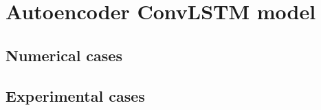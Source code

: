 \section{Autoencoder ConvLSTM model}
\label{sec53}




\subsection{Numerical cases}
\label{sec531}



\subsection{Experimental cases}
\label{sec532}



